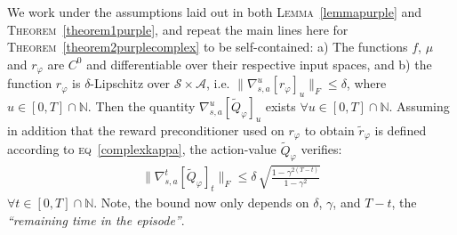 \begin{theorem}
\label{theorem2purplecomplex}
We work under the assumptions laid out in
both \textsc{Lemma}~\ref{lemmapurple} and \textsc{Theorem}~\ref{theorem1purple}, and repeat
the main lines here
for \textsc{Theorem}~\ref{theorem2purplecomplex} to be self-contained:
a) The functions $f$, $\mu$ and $r_\varphi$ are $C^0$ and differentiable
over their respective input spaces,
and b) the function $r_\varphi$ is $\delta$-Lipschitz
over $\mathcal{S} \times \mathcal{A}$, i.e.
$\lVert \nabla_{s,a}^u[r_\varphi]_u \rVert _F \leq \delta$,
where $u \in [0, T] \cap \mathbb{N}$.
Then the quantity $\nabla_{s,a}^u[\widetilde{Q}_\varphi]_u$ exists
$\forall u \in [0, T] \cap \mathbb{N}$.
Assuming in addition that the reward preconditioner used on $r_\varphi$ to obtain $\tilde{r}_\varphi$
is defined according to \textsc{eq}~\ref{complexkappa},
the action-value $\widetilde{Q}_\varphi$ verifies:
\begin{align}
\lVert \nabla_{s,a}^t[\widetilde{Q}_\varphi]_t \rVert _F
\leq
\delta \, \sqrt{\frac{1 - \gamma^{2(T - t)}}{1 - \gamma^2}}
\end{align}
$\forall t \in [0, T] \cap \mathbb{N}$.
Note, the bound now only depends on $\delta$, $\gamma$, and $T-t$, the \textit{``remaining time in the episode''}.
\end{theorem}

